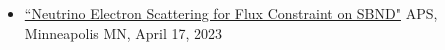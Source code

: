 \documentclass[margin, 10pt]{res} %
\begin{document}
\begin{resume}
\begin{itemize}
    \item \href{https://meetings.aps.org/Meeting/APR23/Session/N10.6}{``Neutrino Electron Scattering for Flux Constraint on SBND"} APS, Minneapolis MN, April 17, 2023
    
\end{itemize}




\end{resume}
\end{document}
